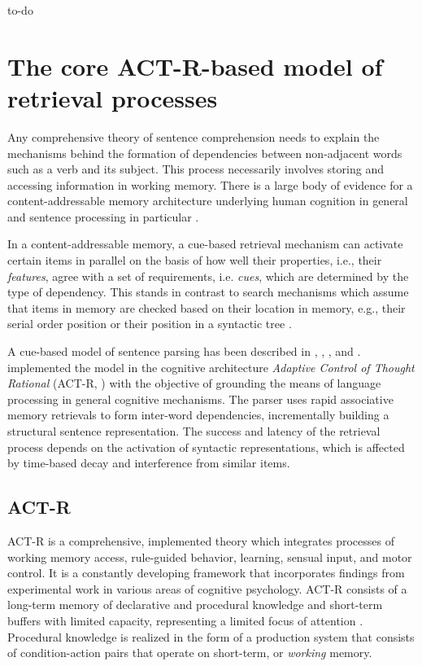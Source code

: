 \documentclass{cambridge7A}\usepackage[]{graphicx}\usepackage[]{color}
\begin{document}
to-do


\chapter{The core ACT-R-based model of retrieval processes} \label{c02}

Any comprehensive theory of sentence comprehension needs to explain the mechanisms behind the formation of dependencies between non-adjacent words such as a verb and its subject. This process necessarily involves storing and accessing information in working memory.
There is a large body of evidence for a content-addressable memory architecture underlying human cognition in general \citep{WatkinsWatkins1975, AndersonLebiere1998,AndersonEtAl2004,Ratcliff1978} and sentence processing in particular \citep{McElree2000,McElreeForakerDyer2003, VanDykeLewis2003, LewisVasishth2005, VanDykeMcElree2011}. 

In a content-addressable memory, a cue-based retrieval mechanism can activate certain items in parallel on the basis of how well their properties, i.e., their \textit{features}, agree with a set of requirements, i.e. \textit{cues}, which are determined by the type of dependency.
This stands in contrast to search mechanisms which assume that items in memory are checked based on their location in memory, e.g., their serial order position \citep{Sternberg1966,Sternberg1969,BerwickWeinberg1984} or their position in a syntactic tree \citep{Sturt2003}. 

A cue-based model of sentence parsing has been described in 
\cite{VanDykeLewis2003}, \cite{LewisVasishth2005}, \cite{LewisVasishthVanDyke2006}, and \cite{VasishthLewis2006}. 
\cite{LewisVasishth2005} implemented the model in the cognitive architecture \emph{Adaptive Control of Thought Rational} (ACT-R, \citealp{AndersonLebiere1998, AndersonEtAl2004}) with the objective of grounding the means of language processing in general cognitive mechanisms.
The parser uses rapid associative memory retrievals to form inter-word dependencies, incrementally building a structural sentence representation. The success and latency of the retrieval process depends on the activation of syntactic representations, which is affected by time-based decay and interference from similar items.

\section{ACT-R}
ACT-R is a comprehensive, implemented theory which integrates processes of working memory access, rule-guided behavior, learning, sensual input, and motor control. 
It is a constantly developing framework that incorporates  findings from experimental work in various areas of cognitive psychology. 
ACT-R consists of a long-term memory of declarative and procedural knowledge and short-term buffers with limited capacity, representing a limited focus of attention \citep{McElree2006,Cowan2001,Miller1956}. 
Procedural knowledge is realized in the form of a production system \citep{Newell1973,Newell1978} that consists of condition-action pairs that operate on short-term, or \emph{working} memory. 
\end{document}
